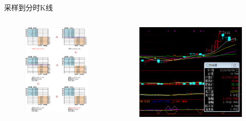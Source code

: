 \begin{frame}{采样到分时K线}
  \begin{columns}
    \column{5cm}
    \begin{figure}
      \centering
      \includegraphics[width=1\textwidth]{figures/fig1.png}
      \end{figure}
    \column{5cm}
    \begin{figure}
      \centering
      \includegraphics[width=1\textwidth]{figures/fig2.png}
      \end{figure}
  \end{columns}
  \end{frame}

